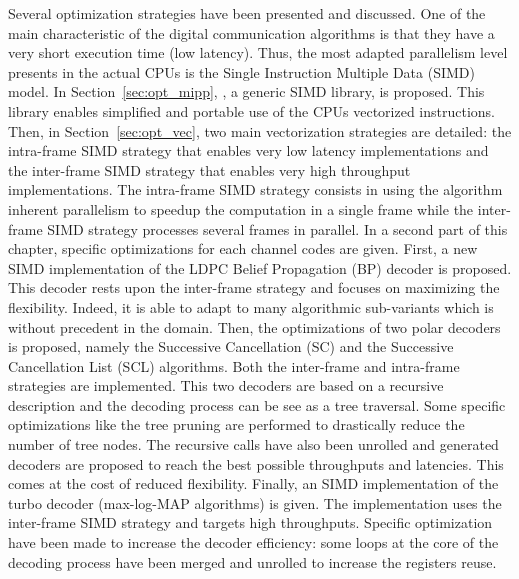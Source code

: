 Several optimization strategies have been presented and discussed. One of the
main characteristic of the digital communication algorithms is that they have a
very short execution time (low latency). Thus, the most adapted parallelism
level presents in the actual CPUs is the Single Instruction Multiple Data (SIMD)
model. In Section~\ref{sec:opt_mipp}, \MIPP, a generic SIMD library, is
proposed. This library enables simplified and portable use of the CPUs
vectorized instructions. Then, in Section~\ref{sec:opt_vec}, two main
vectorization strategies are detailed: the intra-frame SIMD strategy that
enables very low latency implementations and the inter-frame SIMD strategy that
enables very high throughput implementations. The intra-frame SIMD strategy
consists in using the algorithm inherent parallelism to speedup the computation
in a single frame while the inter-frame SIMD strategy processes several frames
in parallel. In a second part of this chapter, specific optimizations for each
channel codes are given. First, a new SIMD implementation of the LDPC Belief
Propagation (BP) decoder is proposed. This decoder rests upon the inter-frame
strategy and focuses on maximizing the flexibility. Indeed, it is able to adapt
to many algorithmic sub-variants which is without precedent in the domain. Then,
the optimizations of two polar decoders is proposed, namely the Successive
Cancellation (SC) and the Successive Cancellation List (SCL) algorithms. Both
the inter-frame and intra-frame strategies are implemented. This two decoders
are based on a recursive description and the decoding process can be see as a
tree traversal. Some specific optimizations like the tree pruning are performed
to drastically reduce the number of tree nodes. The recursive calls have also
been unrolled and generated decoders are proposed to reach the best possible
throughputs and latencies. This comes at the cost of reduced flexibility.
Finally, an SIMD implementation of the turbo decoder (max-log-MAP algorithms) is
given. The implementation uses the inter-frame SIMD strategy and targets high
throughputs. Specific optimization have been made to increase the decoder
efficiency: some loops at the core of the decoding process have been merged and
unrolled to increase the registers reuse.

